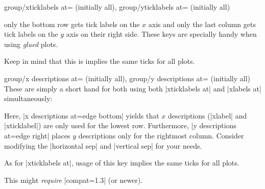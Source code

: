 {\begin{pgfplotskeylist}{%
	group/xticklabels at= (initially all),%
	group/yticklabels at= (initially all)}
\begin{codeexample}
\pgfplotsset{group/xticklabels at=edge bottom,group/yticklabels at=edge right}
\end{codeexample}
only the bottom row gets tick labels on the $x$ axis and only the last column gets tick labels on the $y$ axis on their right side. These keys are
specially handy when using \textit{glued} plots.

	Keep in mind that this is implies the same ticks for all plots.
\end{pgfplotskeylist}

\begin{pgfplotskeylist}{%
	group/x descriptions at= (initially all),%
	group/y descriptions at= (initially all)}
  These are simply a short hand for both using both |xticklabels at| and |xlabels at| simultaneously:

\begin{codeexample}[]
\end{codeexample}

Here, |x descriptions at=edge bottom| yields that $x$ descriptions (|xlabel| and |xticklabel|) are only used for the lowest row. Furthermore, |y descriptions at=edge right| places $y$ descriptions only for the rightmost column. Consider modifying the |horizontal sep| and |vertical sep| for your needs.

	As for |xticklabels at|, usage of this key implies the same ticks for all plots.

	This might \emph{require} |compat=1.3| (or newer).
\end{pgfplotskeylist}

}
